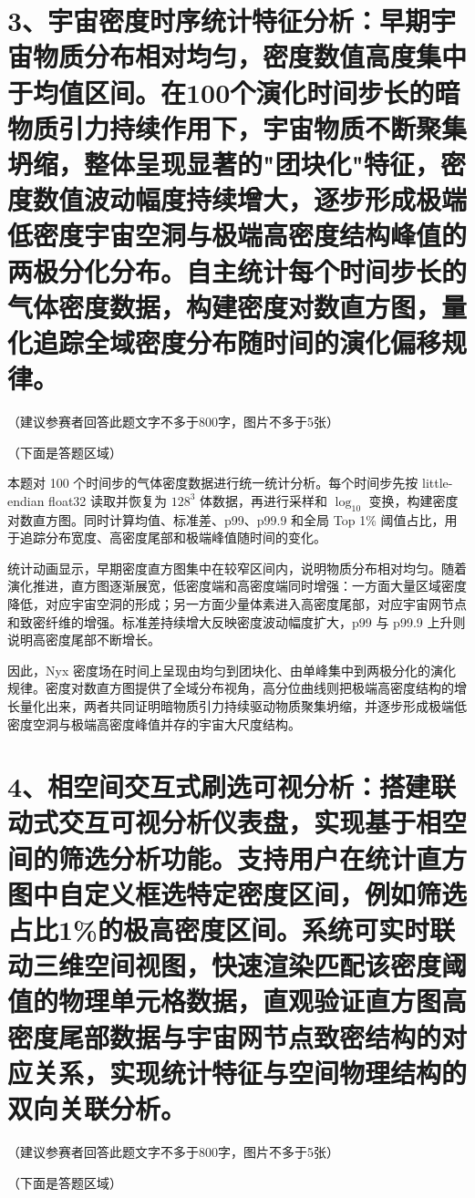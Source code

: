 \documentclass[12pt, a4paper]{article}
\begin{document}
\section*{3、宇宙密度时序统计特征分析：早期宇宙物质分布相对均匀，密度数值高度集中于均值区间。在100个演化时间步长的暗物质引力持续作用下，宇宙物质不断聚集坍缩，整体呈现显著的"团块化"特征，密度数值波动幅度持续增大，逐步形成极端低密度宇宙空洞与极端高密度结构峰值的两极分化分布。自主统计每个时间步长的气体密度数据，构建密度对数直方图，量化追踪全域密度分布随时间的演化偏移规律。}

{\small （建议参赛者回答此题文字不多于800字，图片不多于5张）}

\vspace{0.5em}
\noindent（下面是答题区域）

\noindent 本题对 100 个时间步的气体密度数据进行统一统计分析。每个时间步先按 little-endian float32 读取并恢复为 $128^3$ 体数据，再进行采样和 $\log_{10}$ 变换，构建密度对数直方图。同时计算均值、标准差、p99、p99.9 和全局 Top 1\% 阈值占比，用于追踪分布宽度、高密度尾部和极端峰值随时间的变化。

\noindent 统计动画显示，早期密度直方图集中在较窄区间内，说明物质分布相对均匀。随着演化推进，直方图逐渐展宽，低密度端和高密度端同时增强：一方面大量区域密度降低，对应宇宙空洞的形成；另一方面少量体素进入高密度尾部，对应宇宙网节点和致密纤维的增强。标准差持续增大反映密度波动幅度扩大，p99 与 p99.9 上升则说明高密度尾部不断增长。

\noindent 因此，Nyx 密度场在时间上呈现由均匀到团块化、由单峰集中到两极分化的演化规律。密度对数直方图提供了全域分布视角，高分位曲线则把极端高密度结构的增长量化出来，两者共同证明暗物质引力持续驱动物质聚集坍缩，并逐步形成极端低密度空洞与极端高密度峰值并存的宇宙大尺度结构。

\section*{4、相空间交互式刷选可视分析：搭建联动式交互可视分析仪表盘，实现基于相空间的筛选分析功能。支持用户在统计直方图中自定义框选特定密度区间，例如筛选占比1\%的极高密度区间。系统可实时联动三维空间视图，快速渲染匹配该密度阈值的物理单元格数据，直观验证直方图高密度尾部数据与宇宙网节点致密结构的对应关系，实现统计特征与空间物理结构的双向关联分析。}

{\small （建议参赛者回答此题文字不多于800字，图片不多于5张）}

\vspace{0.5em}
\noindent（下面是答题区域）
\end{document}
